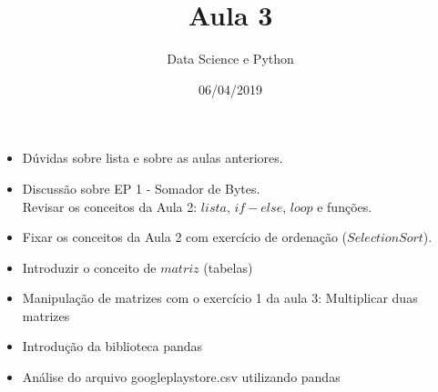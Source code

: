\documentclass[12]{article}
\title{Aula 3}
\author{Data Science e Python}
\date{06/04/2019}
\begin{document}
	\maketitle
	\begin{itemize}
		\item
			Dúvidas sobre lista e sobre as aulas anteriores.
		\item
			Discussão sobre EP 1 - Somador de Bytes.\\
			Revisar os conceitos da Aula 2: $lista$,  $if-else$, $loop$ e funções.
		\item
			Fixar os conceitos da Aula 2 com exercício de ordenação ($Selection
			 Sort$).
		\item
			Introduzir o conceito de $matriz$ (tabelas)
		\item
			Manipulação de matrizes com o exercício 1 da aula 3: Multiplicar duas 
			matrizes
		\item			 	
			Introdução da biblioteca pandas
		\item
			Análise do arquivo googleplaystore.csv utilizando pandas 	
	\end{itemize}
\end{document}
